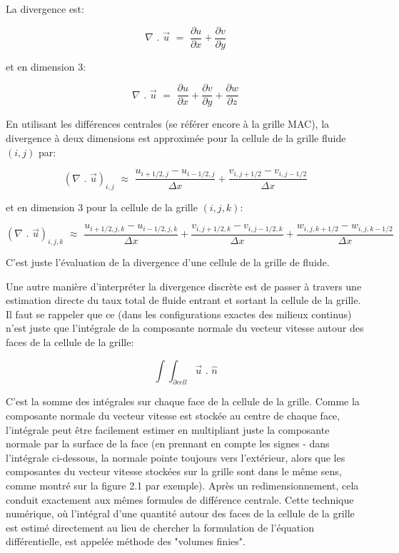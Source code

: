\documentclass[11pt]{report}
\begin{document}
La divergence est:

\begin{equation}
\nabla \,\,.\,\, \overrightarrow{u} \,\, = \,\, \frac{\partial u}{\partial x} + \frac{\partial v}{\partial y} 
\end{equation}

et en dimension 3:

\begin{equation}
\nabla \,\,.\,\, \overrightarrow{u} \,\, = \,\, \frac{\partial u}{\partial x} + \frac{\partial v}{\partial y} + \frac{\partial w}{\partial z}
\end{equation}

En utilisant les différences centrales (se référer encore à la grille MAC), la divergence à deux dimensions est approximée pour la cellule de la grille fluide $(i,j)$ par:

\begin{equation}
(\nabla \,\,.\,\, \overrightarrow{u})_{i,j} \,\, \approx \,\, \frac{u_{i+1/2, j} - u_{i-1/2, j}}{\Delta x} + \frac{v_{i,j+1/2} - v_{i,j-1/2}}{\Delta x}
\end{equation}

et en dimension 3 pour la cellule de la grille $(i,j,k)$:

\begin{equation}
(\nabla \,\,.\,\, \overrightarrow{u})_{i,j,k} \,\, \approx \,\, \frac{u_{i+1/2, j, k} - u_{i-1/2, j, k}}{\Delta x} + \frac{v_{i,j+1/2, k} - v_{i,j-1/2, k}}{\Delta x} + \frac{w_{i, j, k+1/2} - w_{i, j, k-1/2}}{\Delta x}
\end{equation}

C'est juste l'évaluation de la divergence d'une cellule de la grille de fluide.

Une autre manière d'interpréter la divergence discrète est de passer à travers une estimation directe du taux total de fluide entrant et sortant la cellule de la grille. Il faut se rappeler que ce (dans les configurations exactes des milieux continus) n'est juste que l'intégrale de la composante normale du vecteur vitesse autour des faces de la cellule de la grille:

\begin{equation}
\int \!\!\! \int_{\partial cell} \overrightarrow{u} \,\,.\,\, \hat{n}
\end{equation}

C'est la somme des intégrales sur chaque face de la cellule de la grille. Comme la composante normale du vecteur vitesse est stockée au centre de chaque face,  l'intégrale peut être facilement estimer en multipliant juste la composante normale par la surface de la face (en prennant en compte les signes - dans l'intégrale ci-dessous, la normale pointe toujours vers l'extérieur, alors que les composantes du vecteur vitesse stockées sur la grille sont dans le même sens, comme montré sur la figure 2.1 par exemple). Après un redimensionnement, cela conduit exactement aux mêmes formules de différence centrale. Cette technique numérique, où l'intégral d'une quantité autour des faces de la cellule de la grille est estimé directement au lieu de chercher la formulation de l'équation différentielle, est appelée méthode des "volumes finies".\newline
\end{document}

